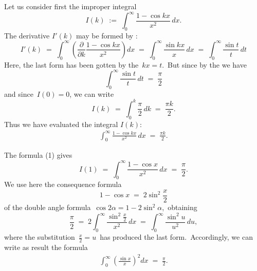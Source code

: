 \documentclass[12pt]{article}
\theoremstyle{definition}
\begin{document}
Let us consider first the improper integral
$$I(k) \;:=\; \int_0^\infty\frac{1-\cos{kx}}{x^2}\,dx.$$
The derivative $I'(k)$ may be formed by :
$$I'(k) \;=\; \int_0^\infty\left(\frac{\partial}{\partial k}\frac{1-\cos{kx}}{x^2}\right) dx 
\;=\; \int_0^\infty\frac{\sin{kx}}{x}\,dx \;=\; \int_0^\infty\frac{\sin{t}}{t}\,dt$$
Here, the last form has been gotten by the  \,$kx = t$.\, 
But since by the  we have
$$\int_0^\infty\frac{\sin{t}}{t}\,dt \;=\; \frac{\pi}{2}$$
and since\, $I(0) = 0$, we can write
$$I(k) \;=\; \int_0^k\frac{\pi}{2}\, dk \;=\; \frac{\pi k}{2}.$$
Thus we have evaluated the integral $I(k)$:
\begin{align}
\int_0^\infty\frac{1-\cos{kx}}{x^2}\,dx \;=\; \frac{\pi k}{2}.
\end{align}


The formula (1) gives
$$I(1) \;=\; \int_0^\infty\frac{1-\cos{x}}{x^2}\,dx \;=\; \frac{\pi}{2}.$$
We use here the consequence formula
$$1-\cos{x} \;=\; 2\sin^2{\frac{x}{2}}$$
of the double angle formula \,$\cos{2\alpha} = 1-2\sin^2{\alpha}$,\, obtaining
$$\frac{\pi}{2} \;=\; 2\int_0^\infty\frac{\sin^2\frac{x}{2}}{x^2}\,dx
\;=\; \int_0^\infty\frac{\sin^2{u}}{u^2}\, du,$$
where the substitution \,$\frac{x}{2} = u$\, has produced the last form.\, Accordingly, we can write as result the formula
\begin{align}
\int_0^\infty\!\left(\!\frac{\sin{x}}{x}\!\right)^2 dx \;=\; \frac{\pi}{2}.
\end{align}





\end{document}
